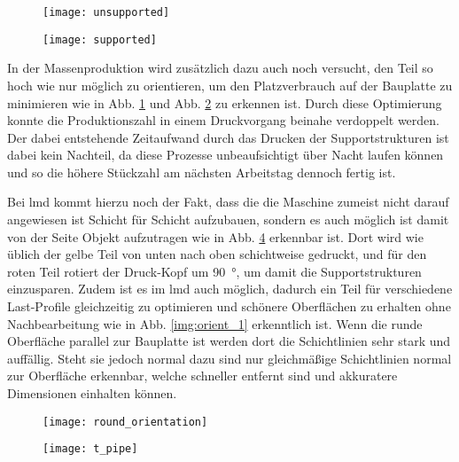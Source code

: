 \documentclass[../main.tex]{subfiles}
\begin{document}
\begin{figure}[H]
	\centering
	\texttt{[image: unsupported]}
	\label{img:unsupp_1}
\end{figure}
\begin{figure}[H]
	\centering
	\texttt{[image: supported]}
	\label{img:supp_1}
\end{figure}
In der Massenproduktion wird zusätzlich dazu auch noch versucht, den Teil so hoch wie nur möglich zu orientieren, um den Platzverbrauch auf der Bauplatte zu minimieren wie in Abb. \ref{img:unsupp_1} und Abb. \ref{img:supp_1} zu erkennen ist. Durch diese Optimierung konnte die Produktionszahl in einem Druckvorgang beinahe verdoppelt werden. Der dabei entstehende Zeitaufwand durch das Drucken der Supportstrukturen ist dabei kein Nachteil, da diese Prozesse unbeaufsichtigt über Nacht laufen können und so die höhere Stückzahl am nächsten Arbeitstag dennoch fertig ist. \cite{lim2015}

Bei \acrfull{lmd} kommt hierzu noch der Fakt, dass die die Maschine zumeist nicht darauf angewiesen ist Schicht für Schicht aufzubauen, sondern es auch möglich ist damit von der Seite Objekt aufzutragen wie in Abb. \ref{img:t_pipe} erkennbar ist. Dort wird wie üblich der gelbe Teil von unten nach oben schichtweise gedruckt, und für den roten Teil rotiert der Druck-Kopf um \qty{90}{\degree}, um damit die Supportstrukturen einzusparen. Zudem ist es im \acrshort{lmd} auch möglich, dadurch ein Teil für verschiedene Last-Profile gleichzeitig zu optimieren und schönere Oberflächen zu erhalten ohne Nachbearbeitung wie in Abb. \ref{img:orient_1} erkenntlich ist. Wenn die runde Oberfläche parallel zur Bauplatte ist werden dort die Schichtlinien sehr stark und auffällig. Steht sie jedoch normal dazu sind nur gleichmäßige Schichtlinien normal zur Oberfläche erkennbar, welche schneller entfernt sind und akkuratere Dimensionen einhalten können.
\begin{figure}[H]
	\centering
	\texttt{[image: round\_orientation]}

	\label{img:round_orient}
\end{figure}
\begin{figure}[H]
	\centering
	\texttt{[image: t\_pipe]}
	\label{img:t_pipe}
\end{figure}
\end{document}
